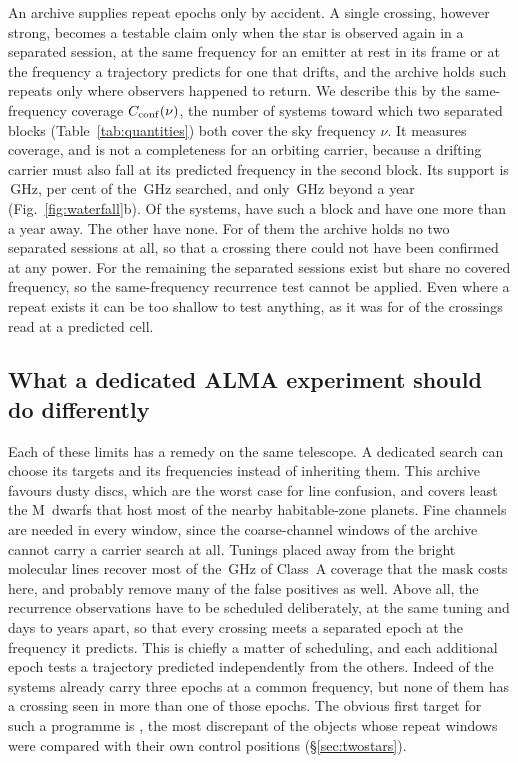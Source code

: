 An archive supplies repeat epochs only by accident. A single crossing,
however strong, becomes a testable claim only when the star is observed
again in a separated session, at the same frequency for an emitter at rest in
its frame or at the frequency a trajectory predicts for one that drifts, and
the archive holds such repeats only where observers happened to return.
We describe this by the same-frequency coverage
$C_{\rm conf}(\nu)$, the number of systems toward which two separated blocks
(Table~\ref{tab:quantities}) both cover the sky frequency $\nu$. It measures
coverage, and is not a completeness for an orbiting carrier, because a
drifting carrier must also fall at its predicted frequency in the second
block. Its support is \CvConfGHzDay\,GHz, \CvConfPctDay{} per cent of the
\CvUnionA\,GHz searched, and only \CvConfGHzYr\,GHz beyond a year
(Fig.~\ref{fig:waterfall}b). Of the \NSysClassA{} systems, \ZcConfSysDay{}
have such a block and \ZcConfSysYr{} have one more than a year away. The
other \ZcNoRepSys{} have none. For \ZcNoRepNoSep{} of them the archive holds
no two separated sessions at all, so that a crossing there could not have been
confirmed at any power. For the remaining \ZcNoRepNoFreqWord{} the separated
sessions exist but share no covered frequency, so the same-frequency
recurrence test cannot be applied. Even where a repeat exists it can be
too shallow to test anything, as it was for \HjNPowerLo{} of the \RcNExcl{}
crossings read at a predicted cell.

\subsection{What a dedicated ALMA experiment should do differently}
\label{sec:future}

Each of these limits has a remedy on the same telescope. A dedicated search
can choose its targets and its frequencies instead of inheriting them. This
archive favours dusty discs, which are the worst case for line confusion, and
covers least the M~dwarfs that host most of the nearby habitable-zone
planets. Fine channels are needed in every window, since the \NCoarse{}
coarse-channel windows of the archive cannot carry a carrier search at all.
Tunings placed away from the bright molecular lines recover most of the
\MkMaskAGHz\,GHz of Class~A coverage that the mask costs here, and probably
remove many of the false positives as well. Above all, the recurrence
observations have to be scheduled deliberately, at the same tuning and days
to years apart, so that every crossing meets a separated epoch at the
frequency it predicts. This is chiefly a matter of scheduling, and each
additional epoch tests a trajectory predicted independently from the others.
Indeed \PaNSysThree{} of the \NSysClassA{} systems already carry three epochs
at a common frequency, but none of them has a crossing seen in more than one
of those epochs. The obvious first target for such a programme is \BkAlmaName, the most
discrepant of the objects whose repeat windows were compared with their own
control positions (\S\ref{sec:twostars}).

